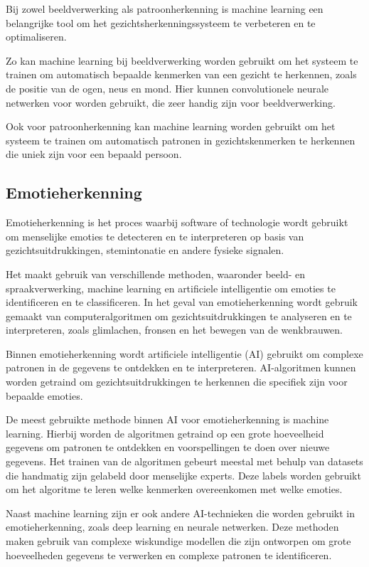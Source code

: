 Bij zowel beeldverwerking als patroonherkenning is machine learning een belangrijke tool om het gezichtsherkenningssysteem te verbeteren en te optimaliseren.

Zo kan machine learning bij beeldverwerking worden gebruikt om het systeem te trainen om automatisch bepaalde kenmerken van een gezicht te herkennen, zoals de positie van de ogen, neus en mond. Hier kunnen convolutionele neurale netwerken voor worden gebruikt, die zeer handig zijn voor beeldverwerking.

Ook voor patroonherkenning kan machine learning worden gebruikt om het systeem te trainen om automatisch patronen in gezichtskenmerken te herkennen die uniek zijn voor een bepaald persoon.

\subsection{Emotieherkenning}

Emotieherkenning is het proces waarbij software of technologie wordt gebruikt om menselijke emoties te detecteren en te interpreteren op basis van gezichtsuitdrukkingen, stemintonatie en andere fysieke signalen.

Het maakt gebruik van verschillende methoden, waaronder beeld- en spraakverwerking, machine learning en artificiele intelligentie om emoties te identificeren en te classificeren. In het geval van emotieherkenning wordt gebruik gemaakt van computeralgoritmen om gezichtsuitdrukkingen te analyseren en te interpreteren, zoals glimlachen, fronsen en het bewegen van de wenkbrauwen.

Binnen emotieherkenning wordt artificiele intelligentie (AI) gebruikt om complexe patronen in de gegevens te ontdekken en te interpreteren. AI-algoritmen kunnen worden getraind om gezichtsuitdrukkingen te herkennen die specifiek zijn voor bepaalde emoties.

De meest gebruikte methode binnen AI voor emotieherkenning is machine learning. Hierbij worden de algoritmen getraind op een grote hoeveelheid gegevens om patronen te ontdekken en voorspellingen te doen over nieuwe gegevens. Het trainen van de algoritmen gebeurt meestal met behulp van datasets die handmatig zijn gelabeld door menselijke experts. Deze labels worden gebruikt om het algoritme te leren welke kenmerken overeenkomen met welke emoties.

Naast machine learning zijn er ook andere AI-technieken die worden gebruikt in emotieherkenning, zoals deep learning en neurale netwerken. Deze methoden maken gebruik van complexe wiskundige modellen die zijn ontworpen om grote hoeveelheden gegevens te verwerken en complexe patronen te identificeren.

